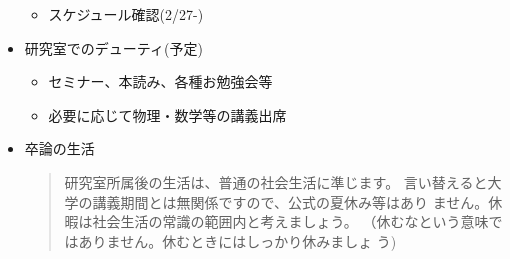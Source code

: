 \documentclass[11pt]{jarticle}
\begin{document}
\begin{itemize}
  \begin{itemize}
  \item スケジュール確認(2/27-)
  \end{itemize}
\item 研究室でのデューティ(予定)
  \begin{itemize}
  \item セミナー、本読み、各種お勉強会等
  \item 必要に応じて物理・数学等の講義出席
  \end{itemize}
\item 卒論の生活
  \begin{quote}
	研究室所属後の生活は、普通の社会生活に準じます。
  言い替えると大学の講義期間とは無関係ですので、公式の夏休み等はあり
  ません。休暇は社会生活の常識の範囲内と考えましょう。
  （休むなという意味ではありません。休むときにはしっかり休みましょ
  う)
  \end{quote}
\end{itemize}
\end{document}
